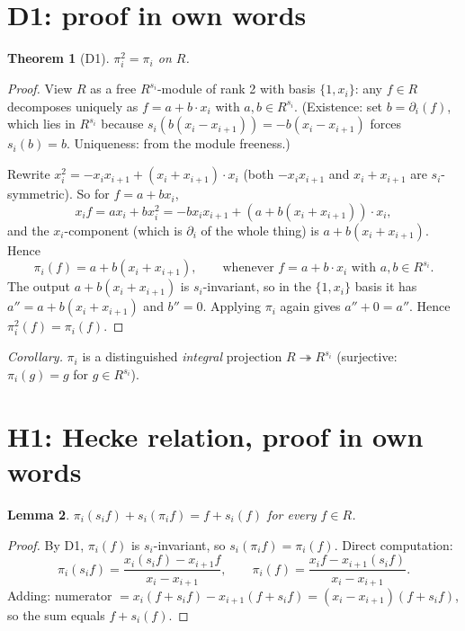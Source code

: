 \documentclass[11pt]{article}
\newtheorem{theorem}{Theorem}
\newtheorem{lemma}[theorem]{Lemma}
\begin{document}
\section{D1: proof in own words}

\begin{theorem}[D1]
$\pi_i^2 = \pi_i$ on $R$.
\end{theorem}

\begin{proof}
View $R$ as a free $R^{s_i}$-module of rank 2 with basis $\{1, x_i\}$: any
$f \in R$ decomposes uniquely as $f = a + b \cdot x_i$ with $a, b \in R^{s_i}$.
(Existence: set $b = \partial_i(f)$, which lies in $R^{s_i}$ because
$s_i(b(x_i - x_{i+1})) = -b(x_i - x_{i+1})$ forces $s_i(b) = b$.
Uniqueness: from the module freeness.)

Rewrite $x_i^2 = -x_i x_{i+1} + (x_i + x_{i+1}) \cdot x_i$ (both $-x_i x_{i+1}$
and $x_i + x_{i+1}$ are $s_i$-symmetric). So for $f = a + b x_i$,
\[
x_i f = a x_i + b x_i^2 = -b x_i x_{i+1} + (a + b(x_i + x_{i+1})) \cdot x_i,
\]
and the $x_i$-component (which is $\partial_i$ of the whole thing) is
$a + b(x_i + x_{i+1})$. Hence
\[
\pi_i(f) = a + b(x_i + x_{i+1}), \qquad
\text{whenever } f = a + b \cdot x_i \text{ with } a, b \in R^{s_i}.
\]
The output $a + b(x_i + x_{i+1})$ is $s_i$-invariant, so in the $\{1, x_i\}$
basis it has $a'' = a + b(x_i + x_{i+1})$ and $b'' = 0$. Applying $\pi_i$
again gives $a'' + 0 = a''$. Hence $\pi_i^2(f) = \pi_i(f)$.
\end{proof}

\noindent\emph{Corollary.} $\pi_i$ is a distinguished \emph{integral}
projection $R \twoheadrightarrow R^{s_i}$ (surjective: $\pi_i(g) = g$ for
$g \in R^{s_i}$).

\section{H1: Hecke relation, proof in own words}

\begin{lemma}\label{lem:swap}
$\pi_i(s_i f) + s_i(\pi_i f) = f + s_i(f)$ for every $f \in R$.
\end{lemma}
\begin{proof}
By D1, $\pi_i(f)$ is $s_i$-invariant, so $s_i(\pi_i f) = \pi_i(f)$. Direct
computation:
\[
\pi_i(s_i f) = \frac{x_i (s_i f) - x_{i+1} f}{x_i - x_{i+1}},
\qquad
\pi_i(f) = \frac{x_i f - x_{i+1}(s_i f)}{x_i - x_{i+1}}.
\]
Adding: numerator $= x_i(f + s_i f) - x_{i+1}(f + s_i f)
       = (x_i - x_{i+1})(f + s_i f)$, so the sum equals $f + s_i(f)$.
\end{proof}
\end{document}
